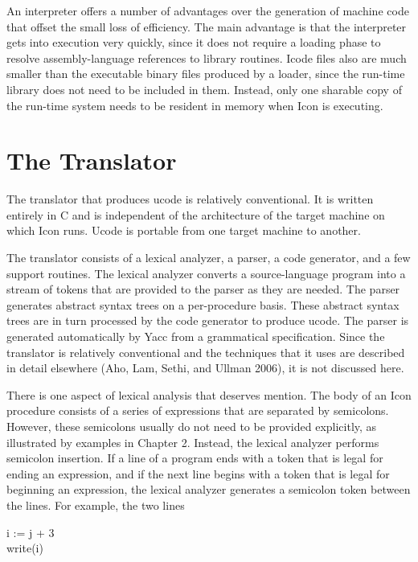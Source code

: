 An interpreter offers a number of advantages over the generation of
machine code that offset the small loss of efficiency. The main
advantage is that the interpreter gets into execution very quickly,
since it does not require a loading phase to resolve assembly-language
references to library routines. Icode files also are much smaller than
the executable binary files produced by a loader, since the run-time
library does not need to be included in them. Instead, only one
sharable copy of the run-time system needs to be resident in memory
when Icon is executing.


\section{The Translator}

The translator that produces ucode is relatively conventional. It is
written entirely in C and is independent of the architecture of the
target machine on which Icon runs. Ucode is portable from one target
machine to another.

The translator consists of a lexical analyzer, a parser, a code
generator, and a few support routines. The lexical analyzer converts a
source-language program into a stream of tokens that are provided to
the parser as they are needed.  The parser generates abstract syntax
trees on a per-procedure basis. These abstract syntax trees are in
turn processed by the code generator to produce ucode. The parser is
generated automatically by Yacc from a grammatical specification.
Since the translator is relatively conventional and the techniques
that it uses are described in detail elsewhere (Aho, Lam, Sethi, and
Ullman 2006), it is not discussed here.

There is one aspect of lexical analysis that deserves mention. The
body of an Icon procedure consists of a series of expressions that are
separated by semicolons. However, these semicolons usually do not need
to be provided explicitly, as illustrated by examples in Chapter
2. Instead, the lexical analyzer performs semicolon insertion. If a
line of a program ends with a token that is legal for ending an
expression, and if the next line begins with a token that is legal for
beginning an expression, the lexical analyzer generates a semicolon
token between the lines. For example, the two lines

\begin{iconcode}
\>i := j\textit{ }+ 3\\
\>write(i)
\end{iconcode}

